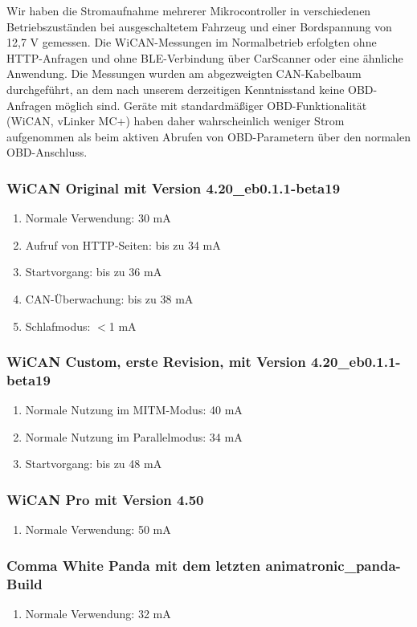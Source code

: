 \documentclass[superscriptaddress,onecolumn,floatfix]{revtex4-2}
\begin{document}
Wir haben die Stromaufnahme mehrerer Mikrocontroller in verschiedenen Betriebszuständen bei ausgeschaltetem Fahrzeug und einer Bordspannung von 12,7 V gemessen. Die WiCAN-Messungen im Normalbetrieb erfolgten ohne HTTP-Anfragen und ohne BLE-Verbindung über CarScanner oder eine ähnliche Anwendung. Die Messungen wurden am abgezweigten CAN-Kabelbaum durchgeführt, an dem nach unserem derzeitigen Kenntnisstand keine OBD-Anfragen möglich sind. Geräte mit standardmäßiger OBD-Funktionalität (WiCAN, vLinker MC+) haben daher wahrscheinlich weniger Strom aufgenommen als beim aktiven Abrufen von OBD-Parametern über den normalen OBD-Anschluss.

\subsubsection{WiCAN Original mit Version 4.20\_eb0.1.1-beta19}
\begin{enumerate}
  \item Normale Verwendung: 30 mA
  \item Aufruf von HTTP-Seiten: bis zu 34 mA
  \item Startvorgang: bis zu 36 mA
  \item CAN-Überwachung: bis zu 38 mA
  \item Schlafmodus: $<$1 mA
\end{enumerate}

\subsubsection{WiCAN Custom, erste Revision, mit Version 4.20\_eb0.1.1-beta19}
\begin{enumerate}
  \item Normale Nutzung im MITM-Modus: 40 mA
  \item Normale Nutzung im Parallelmodus: 34 mA
  \item Startvorgang: bis zu 48 mA
\end{enumerate}

\subsubsection{WiCAN Pro mit Version 4.50}
\begin{enumerate}
  \item Normale Verwendung: 50 mA
\end{enumerate}

\subsubsection{Comma White Panda mit dem letzten animatronic\_panda-Build}
\begin{enumerate}
  \item Normale Verwendung: 32 mA
\end{enumerate}
\end{document}
